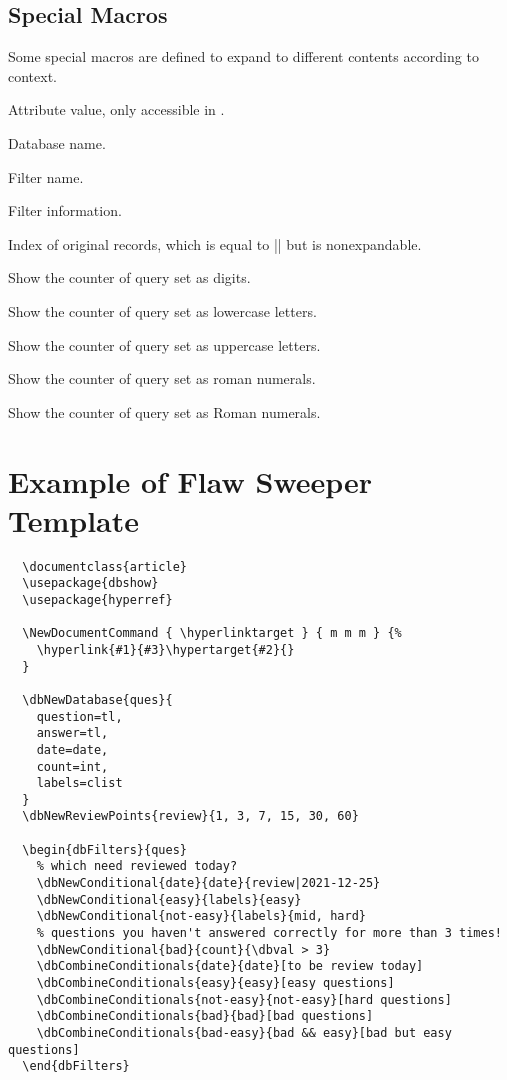 \documentclass[full]{l3doc}
\begin{document}
\begin{documentation}
\subsection{Special Macros}

Some special macros are defined to expand to different contents according to context.

\DescribeMacro{\dbval} Attribute value, only accessible in .

\DescribeMacro{\dbDatabase} Database name.

\DescribeMacro{\dbFilterName} Filter name.

\DescribeMacro{\dbFilterInfo} Filter information.

\DescribeMacro{\dbIndex} Index of original records, which is equal to || but  is nonexpandable.


\DescribeMacro{\dbarabic} Show the counter of query set as digits.

\DescribeMacro{\dbalph} Show the counter of query set as lowercase letters.

\DescribeMacro{\dbAlph} Show the counter of query set as uppercase letters.

\DescribeMacro{\dbroman} Show the counter of query set as roman numerals.

\DescribeMacro{\dbRoman} Show the counter of query set as Roman numerals.

\section{Example of Flaw Sweeper Template}
\label{sec:example}

\begin{verbatim}
  \documentclass{article}
  \usepackage{dbshow}
  \usepackage{hyperref}

  \NewDocumentCommand { \hyperlinktarget } { m m m } {%
    \hyperlink{#1}{#3}\hypertarget{#2}{}
  }

  \dbNewDatabase{ques}{
    question=tl,
    answer=tl,
    date=date,
    count=int,
    labels=clist
  }
  \dbNewReviewPoints{review}{1, 3, 7, 15, 30, 60}

  \begin{dbFilters}{ques}
    % which need reviewed today?
    \dbNewConditional{date}{date}{review|2021-12-25}
    \dbNewConditional{easy}{labels}{easy}
    \dbNewConditional{not-easy}{labels}{mid, hard}
    % questions you haven't answered correctly for more than 3 times!
    \dbNewConditional{bad}{count}{\dbval > 3}
    \dbCombineConditionals{date}{date}[to be review today]
    \dbCombineConditionals{easy}{easy}[easy questions]
    \dbCombineConditionals{not-easy}{not-easy}[hard questions]
    \dbCombineConditionals{bad}{bad}[bad questions]
    \dbCombineConditionals{bad-easy}{bad && easy}[bad but easy questions]
  \end{dbFilters}


\end{verbatim}
\end{documentation}
\end{document}

